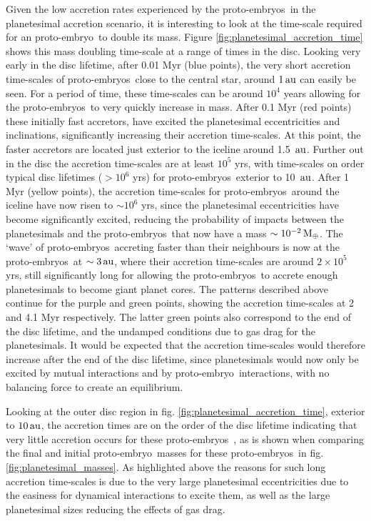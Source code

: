 \documentclass[a4paper,fleqn,usenatbib]{mnras}
\newcommand{\me}{{\, {\rm M}_{\oplus}}}
\newcommand{\au}{{\, {\rm au}}}
\newcommand{\emb}{{{proto-embryo~}}}
\newcommand{\embs}{{{proto-embryos~}}}
\begin{document}
Given the low accretion rates experienced by the \embs in the planetesimal accretion scenario, it is interesting to look at the time-scale required for an \emb to double its mass.
Figure \ref{fig:planetesimal_accretion_time} shows this mass doubling time-scale at a range of times in the disc.
Looking very early in the disc lifetime, after 0.01 Myr (blue points), the very short accretion time-scales of \embs close to the central star, around $1 \au$ can easily be seen.
For a period of time, these time-scales can be around $10^4$ years allowing for the \embs to very quickly increase in mass.
After 0.1 Myr (red points) these initially fast accretors, have excited the planetesimal eccentricities and inclinations, significantly increasing their accretion time-scales.
At this point, the faster accretors are located just exterior to the iceline around 1.5 $\au$.
Further out in the disc the accretion time-scales are at least $10^5$ yrs, with time-scales on order typical disc lifetimes ($>10^6$ yrs) for \embs exterior to 10 $\au$.
After 1 Myr (yellow points), the accretion time-scales for \embs around the iceline have now risen to $\sim10^6$ yrs, since the planetesimal eccentricities have become significantly excited, reducing the probability of impacts between the planetesimals and the \embs that now have a mass $\sim 10^{-2} \me$.
The `wave' of \embs accreting faster than their neighbours is now at the \embs at $\sim 3\au$, where their accretion time-scales are around $2\times 10^5$ yrs, still significantly long for allowing the \embs to accrete enough planetesimals to become giant planet cores.
The patterns described above continue for the purple and green points, showing the accretion time-scales at 2 and 4.1 Myr respectively.
The latter green points also correspond to the end of the disc lifetime, and the undamped conditions due to gas drag for the planetesimals.
It would be expected that the accretion time-scales would therefore increase after the end of the disc lifetime, since planetesimals would now only be excited by mutual interactions and by \emb interactions, with no balancing force to create an equilibrium.

Looking at the outer disc region in fig. \ref{fig:planetesimal_accretion_time}, exterior to $10 \au$, the accretion times are on the order of the disc lifetime indicating that very little accretion occurs for these \embs, as is shown when comparing the final and initial \emb masses for these \embs in fig. \ref{fig:planetesimal_masses}.
As highlighted above the reasons for such long accretion time-scales is due to the very large planetesimal eccentricities due to the easiness for dynamical interactions to excite them, as well as the large planetesimal sizes reducing the effects of gas drag.
\end{document}
